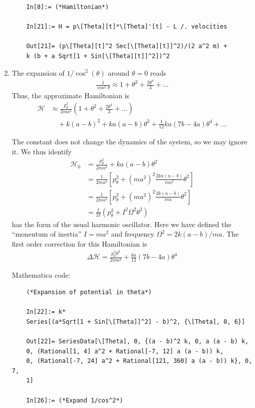 \documentclass{article}
\theoremstyle{definition}
\newcommand{\ham}{\mathcal{H}}
\newcommand{\f}[2]{\frac{#1}{#2}}
\newcommand{\lp}{\left(}
\newcommand{\rp}{\right)}
\newcommand{\lb}{\left[}
\newcommand{\rb}{\right]}
\begin{document}
\begin{enumerate}[label=(\alph*)]
\begin{lstlisting}
	In[8]:= (*Hamiltonian*)
	
	In[21]:= H = p\[Theta][t]*\[Theta]'[t] - L /. velocities
	
	Out[21]= (p\[Theta][t]^2 Sec[\[Theta][t]]^2)/(2 a^2 m) + 
	k (b + a Sqrt[1 + Sin[\[Theta][t]]^2])^2
	\end{lstlisting}
	
	\item The expansion of $1/\cos^2(\theta)$ around $\theta = 0$ reads
	\begin{align*}
	\f{1}{\cos^2\theta} \approx 1 + \theta^2 + \f{2\theta^4}{3} + \dots 
	\end{align*} 
	Thus, the approximate Hamiltonian is 
	\begin{align*}
	\ham &\approx \f{p_\theta^2}{2ma^2}\lp 1 + \theta^2 + \f{2\theta^4}{3} + \dots  \rp \\
	&\quad+ k(a-b)^2 + ka(a-b)\theta^2 + \f{1}{12}ka(7b -4a)\theta^4  + \dots
	\end{align*}
	
	
	The constant does not change the dynamics of the system, so we may ignore it. We thus identify 
	\begin{align*}
	\ham_0 
	&= \f{p_\theta^2}{2ma^2} + ka(a-b)\theta^2 \\
	&= \f{1}{2ma^2}\lb p_\theta^2 + (ma^2)^2 \f{2ka(a-b)}{ma^2}\theta^2  \rb\\
	&= \f{1}{2ma^2}\lb p_\theta^2 + (ma^2)^2 \f{2k(a-b)}{ma}\theta^2  \rb\\
	&= \boxed{\f{1}{2I}\lp p_\theta^2 + I^2 \Omega^2 \theta^2 \rp}
	\end{align*}
	has the form of the usual harmonic oscillator. Here we have defined the ``monentum of inertia'' $I = ma^2$ and frequency $\Omega^2 = 2k(a-b)/ma$. The first order correction for this Hamiltonian is 
	\begin{align*}
	\boxed{\Delta \ham = \f{p_\theta^2\theta^2}{2ma^2} + \f{ka}{12}(7b - 4a) \theta^4}
	\end{align*}
	
	Mathematica code:
	\begin{lstlisting}
	(*Expansion of potential in theta*)
	
	In[22]:= k*
	Series[(a*Sqrt[1 + Sin[\[Theta]]^2] - b)^2, {\[Theta], 0, 6}]
	
	Out[22]= SeriesData[\[Theta], 0, {(a - b)^2 k, 0, a (a - b) k, 
	0, (Rational[1, 4] a^2 + Rational[-7, 12] a (a - b)) k, 
	0, (Rational[-7, 24] a^2 + Rational[121, 360] a (a - b)) k}, 0, 7,
	1]
	
	In[26]:= (*Expand 1/cos^2*)
	

\end{lstlisting}
\end{enumerate}
\end{document}
